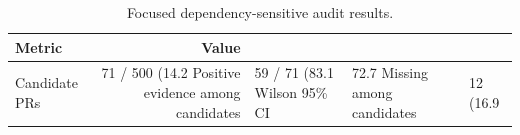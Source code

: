 \begin{table}[t]
\centering
\caption{Focused dependency-sensitive audit results.}
\label{tab:dependency-sensitive-audit}
\footnotesize
\begin{tabular}{@{}lr@{}}
\toprule
Metric & Value \\
\midrule
Candidate PRs & 71 / 500 (14.2%
Positive evidence among candidates & 59 / 71 (83.1%
Wilson 95\% CI & 72.7%
Missing among candidates & 12 (16.9%
\bottomrule
\end{tabular}
\end{table}
